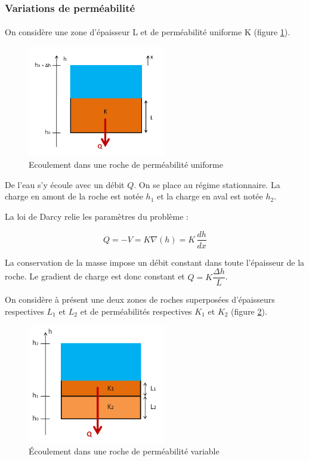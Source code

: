 \documentclass{article}
\begin{document}
\subsubsection{Variations de perméabilité}
\paragraph{} On considère une zone d’épaisseur L et de perméabilité uniforme K (figure \ref{fig:ecoulement_permea_uniforme}).

\begin{figure}[H]
    \centering
    \includegraphics[width=6cm]{A_III_B_1.png}
    \caption{Ecoulement dans une roche de perméabilité uniforme}
    \label{fig:ecoulement_permea_uniforme}
\end{figure}
De l’eau s’y écoule avec un débit $Q$. On se place au régime stationnaire. La charge en amont de la roche est notée $h_1$ et la charge en aval est notée $h_2$.

La loi de Darcy relie les paramètres du problème :

$$ Q = -V = K\nabla(h) = K\,\frac{dh}{dx} $$


La conservation de la masse impose un débit constant dans toute l’épaisseur de la roche. Le gradient de charge est donc constant et $Q = K\dfrac{\Delta h}{L}$.

On considère à présent une deux zones de roches superposées d’épaisseurs respectives $L_1$ et $L_2$ et de perméabilités respectives $K_1$ et $K_2$ (figure \ref{fig:ecoulement_permea_variable}).

\begin{figure}[H]
    \centering
    \includegraphics[width=6cm]{A_III_B_2.png}
    \caption{Écoulement dans une roche de perméabilité variable}
    \label{fig:ecoulement_permea_variable}
\end{figure}
\end{document}
